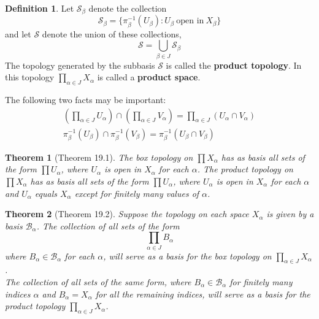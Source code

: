 \documentclass{article}
\newtheorem{theorem}{Theorem}
\theoremstyle{definition}
\newtheorem{definition}{Definition}[section]
\theoremstyle{remark}
\begin{document}
    \begin{definition}
        Let $\mathcal{S}_{\beta}$ denote the collection
        \[ \mathcal{S}_{\beta} = \{\pi_{\beta}^{-1}(U_{\beta}): U_{\beta}\:\text{open in}\: X_{\beta}\} \]
        and let $\mathcal{S}$ denote the union of these collections,
        \[ \mathcal{S} = \bigcup_{\beta\in J} \mathcal{S}_{\beta} \]
        The topology generated by the subbasis $\mathcal{S}$ is called the \textbf{product topology}. In this topology 
        $\prod_{\alpha\in J} X_{\alpha}$ is called a \textbf{product space}.
    \end{definition}

    The following two facts may be important:
    \begin{align*}
        (\prod_{\alpha\in J} U_{\alpha}) \cap (\prod_{\alpha\in J} V_{\alpha}) = \prod_{\alpha\in J} (U_{\alpha}\cap V_{\alpha}) \\
        \pi_{\beta}^{-1}(U_{\beta}) \cap \pi_{\beta}^{-1}(V_{\beta}) = \pi_{\beta}^{-1}(U_{\beta} \cap V_{\beta})
    \end{align*}

    \begin{theorem}[Theorem 19.1]
        The box topology on $\prod X_{\alpha}$ has as basis all sets of the form $\prod U_{\alpha}$, where $U_{\alpha}$
        is open in $X_{\alpha}$ for each $\alpha$. The product topology on $\prod X_{\alpha}$ has as basis all sets of the form
        $\prod U_{\alpha}$, where $U_{\alpha}$ is open in $X_{\alpha}$ for each $\alpha$ and $U_{\alpha}$ equals $X_{\alpha}$
        except for finitely many values of $\alpha$.
    \end{theorem}

    \begin{theorem}[Theorem 19.2]
        Suppose the topology on each space $X_{\alpha}$ is given by a basis $\mathcal{B}_{\alpha}$. The collection of all sets of
        the form
        \[ \prod_{\alpha\in J} B_{\alpha} \]
        where $B_{\alpha}\in\mathcal{B}_{\alpha}$ for each $\alpha$, will serve as a basis for the box topology on 
        $\prod_{\alpha\in J} X_{\alpha}$.\\
        The collection of all sets of the same form, where $B_{\alpha}\in\mathcal{B}_{\alpha}$ for finitely many
        indices $\alpha$ and $B_{\alpha} = X_{\alpha}$ for all the remaining indices, will serve as a basis for the product topology
        $\prod_{\alpha\in J} X_{\alpha}$.
    \end{theorem}
\end{document}
